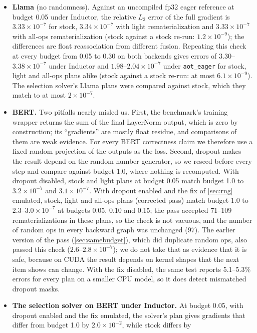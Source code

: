 \documentclass[10pt]{article}
\newcommand{\code}[1]{\texttt{#1}}
\begin{document}
\begin{itemize}
\item \textbf{Llama} (no randomness). Against an uncompiled fp32 eager reference at budget 0.05 under Inductor, the relative
$L_2$ error of the full gradient is $3.33\times10^{-7}$ for stock, $3.34\times10^{-7}$ with light rematerialization and
$3.33\times10^{-7}$ with all-ops rematerialization (stock against a stock re-run: $1.2\times10^{-9}$); the differences
are float reassociation from different fusion. Repeating this check at every budget from 0.05 to 0.30 on both backends
gives errors of $3.30$--$3.38\times10^{-7}$ under Inductor and $1.98$--$2.04\times10^{-7}$ under \code{aot\_eager} for
stock, light and all-ops plans alike (stock against a stock re-run: at most $6.1\times10^{-9}$). The selection solver's
Llama plans were compared against stock, which they match to at most $2\times10^{-7}$.
\item \textbf{BERT.} Two pitfalls nearly misled us. First, the benchmark's training wrapper returns the sum of the final
LayerNorm output, which is zero by construction; its ``gradients'' are mostly float residue, and comparisons of them are
weak evidence. For every BERT correctness claim we therefore use a fixed random projection of the outputs as the loss.
Second, dropout makes the result depend on the random number generator, so we reseed before every step and compare
against budget 1.0, where nothing is recomputed. With dropout disabled, stock and light plans at budget 0.05 match budget
1.0 to $3.2\times10^{-7}$ and $3.1\times10^{-7}$. With dropout enabled and the fix of \cref{sec:rng} emulated, stock,
light and all-ops plans (corrected pass) match budget 1.0 to $2.3$--$3.0\times10^{-7}$ at budgets 0.05, 0.10 and 0.15;
the pass accepted 71--109 rematerializations in these plans, so the check is not vacuous, and the number of random ops in
every backward graph was unchanged (97). The earlier version of the pass (\cref{sec:samebudget}), which did duplicate
random ops, also passed this check ($2.6$--$2.8\times10^{-7}$); we do not take that as evidence that it is safe, because
on CUDA the result depends on kernel shapes that the next item shows can change. With the fix disabled, the same test reports
5.1--5.3\% errors for every plan on a smaller CPU model, so it does detect mismatched dropout masks.
\item \textbf{The selection solver on BERT under Inductor.} At budget 0.05, with dropout enabled and the fix emulated,
the solver's plan gives gradients that differ from budget 1.0 by $2.0\times10^{-2}$, while stock differs by

\end{itemize}
\end{document}
